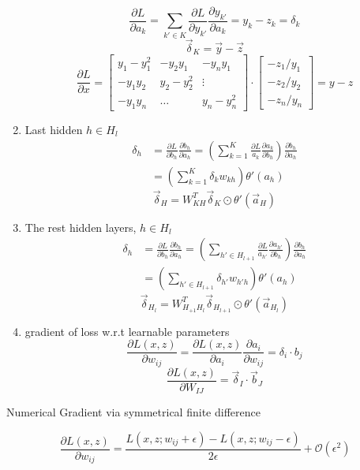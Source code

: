 \begin{enumerate}
		 $$ \frac{\partial L}{\partial a_k} = \sum_{k'\in K} \frac{\partial L}{\partial y_{k'}}
			\frac{\partial y_{k'}}{\partial a_k} = y_k - z_k = \delta_k $$
		 $$\vec{\delta}_K = \vec{y} - \vec{z}$$
		 $$\frac{\partial L}{\partial x} = \begin{bmatrix}
			 y_1 - y_1^2 & -y_2y_1 & -y_ny_1\\
			 -y_1y_2 & y_2 - y_2^2 & \vdots \\
		 -y_1y_n & \ldots & y_n-y_n^2 \end{bmatrix} \cdot \begin{bmatrix}
		 -z_1/y_1 \\ -z_2/y_2 \\ -z_n/y_n \end{bmatrix} = y-z $$
 \item Last hidden $h \in H_l$\\
	 \begin{align*}
		 \delta_h &= \frac{\partial L}{\partial b_h} \frac{\partial b_h}{\partial a_h} =
	 (\sum_{k=1}^K  \frac{\partial L}{a_k} \frac{\partial a_k}{\partial b_h}) \frac{\partial b_h}{\partial a_h} \\
		 &= (\sum_{k=1}^K \delta_k w_{kh}) \theta'(a_h)
	 \end{align*}
		 $$\vec{\delta}_H = W_{KH}^T \vec{\delta}_K \odot
			\theta'(\vec{a}_H)$$
 \item The rest hidden layers, $h \in H_l$\\
	 \begin{align*}
		 \delta_h &= \frac{\partial L}{\partial b_h} \frac{\partial b_h}{\partial a_h} =
		 (\sum_{h' \in H_{l+1}}  \frac{\partial L}{a_{h'}} \frac{\partial a_{h'}}{\partial b_h}) \frac{\partial b_h}{\partial a_h} \\
		 &= (\sum_{h'\in H_{l+1}} \delta_{h'} w_{h'h}) \theta'(a_h)
	 \end{align*}
		 $$\vec{\delta}_{H_l} = W_{H_{+1} H_l}^T \vec{\delta}_{H_{l+1}}
		 \odot \theta'(\vec{a}_{H_l})$$
 \item gradient of loss w.r.t learnable parameters
	 $$\frac{\partial L(x,z)}{\partial w_{ij}} =
		 \frac{\partial L(x,z)}{\partial a_i}
		 \frac{\partial a_i}{\partial w_{ij}} =
		 \delta_i \cdot b_j$$
		 $$\frac{\partial L(x,z)}{\partial W_{IJ}} = 
		 \vec{\delta}_I \cdot \vec{b}_J$$
 \end{enumerate}

 Numerical Gradient via symmetrical finite difference

 $$\frac{\partial L(x,z)}{\partial w_{ij}} = 
	\frac{L(x,z; w_{ij}+\epsilon) - L(x,z; w_{ij}-\epsilon)}{2\epsilon}
	+ \mathcal{O}(\epsilon^2)$$


